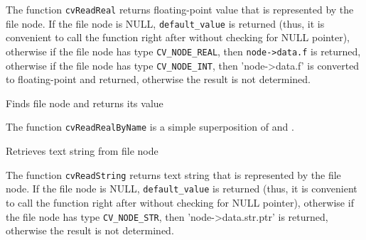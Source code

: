 The function \texttt{cvReadReal} returns floating-point value
that is represented by the file node. If the file node is NULL,
\texttt{default\_value} is returned (thus, it is convenient to call
the function right after  without checking for NULL
pointer), otherwise if the file node has type \texttt{CV\_NODE\_REAL},
then \texttt{node->data.f} is returned, otherwise if the file node has type
\texttt{CV\_NODE\_INT}, then 'node->data.f' is converted to floating-point
and returned, otherwise the result is not determined.

\label{ReadRealByName}

Finds file node and returns its value


\begin{description}
\end{description}

The function \texttt{cvReadRealByName} is a simple superposition of  and .

\label{ReadString}

Retrieves text string from file node


\begin{description}
\end{description}

The function \texttt{cvReadString} returns text string that is represented
by the file node. If the file node is NULL, \texttt{default\_value}
is returned (thus, it is convenient to call the function right after
 without checking for NULL pointer), otherwise if
the file node has type \texttt{CV\_NODE\_STR}, then 'node->data.str.ptr'
is returned, otherwise the result is not determined.

